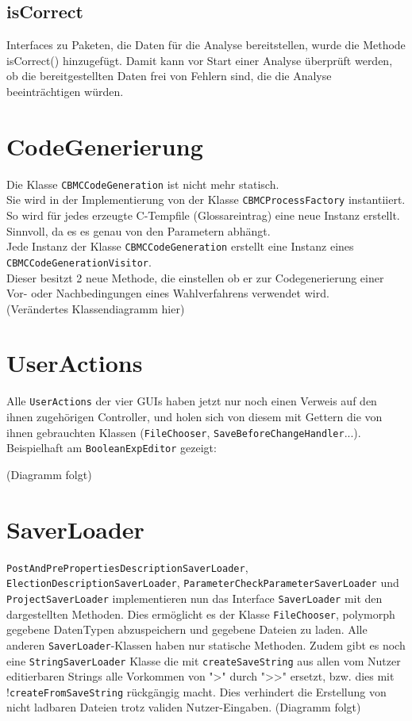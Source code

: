 \documentclass[a4paper]{scrreprt}
\begin{document}
\subsection{isCorrect}
Interfaces zu Paketen, die Daten für die Analyse bereitstellen, wurde die Methode isCorrect() hinzugefügt. Damit kann vor Start einer Analyse überprüft werden, ob die bereitgestellten Daten frei von Fehlern sind, die die Analyse beeinträchtigen würden.


\section{CodeGenerierung}

Die Klasse \verb!CBMCCodeGeneration! ist nicht mehr statisch. \\
Sie wird in der Implementierung von der Klasse \verb!CBMCProcessFactory! instantiiert. \\
So wird für jedes erzeugte C-Tempfile (Glossareintrag) eine neue Instanz erstellt. Sinnvoll, da es es genau von den Parametern abhängt. \\
Jede Instanz der Klasse \verb!CBMCCodeGeneration! erstellt eine Instanz eines \verb!CBMCCodeGenerationVisitor!. \\
Dieser besitzt 2 neue Methode, die einstellen ob er zur Codegenerierung einer Vor- oder Nachbedingungen eines Wahlverfahrens verwendet wird.  \\
(Verändertes Klassendiagramm hier)

\section{UserActions}
Alle \verb!UserActions! der vier GUIs haben jetzt nur noch einen Verweis auf den ihnen zugehörigen Controller, und holen sich von diesem mit Gettern die von ihnen gebrauchten Klassen (\verb!FileChooser!, \verb!SaveBeforeChangeHandler!...). Beispielhaft am \verb!BooleanExpEditor! gezeigt:
\newline

(Diagramm folgt)
\newline

\section{SaverLoader}
\verb!PostAndPrePropertiesDescriptionSaverLoader!, \verb!ElectionDescriptionSaverLoader!, \verb!ParameterCheckParameterSaverLoader! und \verb!ProjectSaverLoader! implementieren nun das Interface \verb!SaverLoader! mit den dargestellten Methoden. Dies ermöglicht es der Klasse \verb!FileChooser!, polymorph gegebene DatenTypen abzuspeichern und gegebene Dateien zu laden.
Alle anderen \verb!SaverLoader!-Klassen haben nur statische Methoden.
Zudem gibt es noch eine \verb!StringSaverLoader! Klasse die mit \verb!createSaveString! aus allen vom Nutzer editierbaren Strings alle Vorkommen von ">" durch ">>" ersetzt, bzw. dies mit !\verb!createFromSaveString! rückgängig macht. Dies verhindert die Erstellung von nicht ladbaren Dateien trotz validen Nutzer-Eingaben.
\newline
(Diagramm folgt)
\newline
\end{document}
